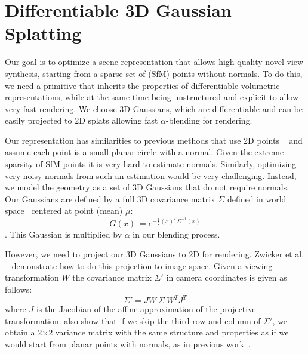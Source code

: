 \section{Differentiable 3D Gaussian Splatting}
\label{sec:3d-splats}


Our goal is to optimize a scene representation that allows high-quality novel view synthesis, starting from a sparse set of (SfM) points without normals. To do this, we need a primitive that inherits the properties of differentiable volumetric representations, while at the same time being unstructured and explicit to allow very fast rendering. We choose 3D Gaussians, which are differentiable
and can be easily projected to 2D splats allowing fast $\alpha$-blending for rendering.

Our representation has similarities to
previous methods that use 2D points ~\cite{yifan19,kopanas21} and assume each point is a small planar circle with a normal.
Given the extreme sparsity of SfM points it is very hard to estimate normals. Similarly, optimizing very noisy normals from such an estimation would be very challenging.
Instead, we model the geometry as a set of 3D Gaussians that do not require normals. Our Gaussians are defined by a full 3D covariance matrix $\Sigma$ defined in world space~\cite{zwicker2001ewa} centered at point (mean) $\mu$:
\begin{equation}
	G(x)~= e^{-\frac{1}{2}(x)^{T}\Sigma^{-1}(x)}
\end{equation}
. This Gaussian is multiplied by $\alpha$ in our blending process.

However, we need to project our 3D Gaussians to 2D for rendering.
Zwicker et al. ~ demonstrate how to do this projection to image space. Given a viewing transformation $W$
the covariance matrix $\Sigma'$ in camera coordinates is given as follows:
\begin{equation}
	\label{eq:volume-render}
	\Sigma' = J W ~\Sigma ~W ^{T}J^{T}
\end{equation}
where $J$ is the Jacobian of the affine approximation of the projective transformation.  also show that if we skip the third row and column of $\Sigma'$,
	we obtain a 2$\times$2 variance matrix with the same structure and properties as if we would start from planar points with normals, as in previous work~\cite{kopanas21}.

